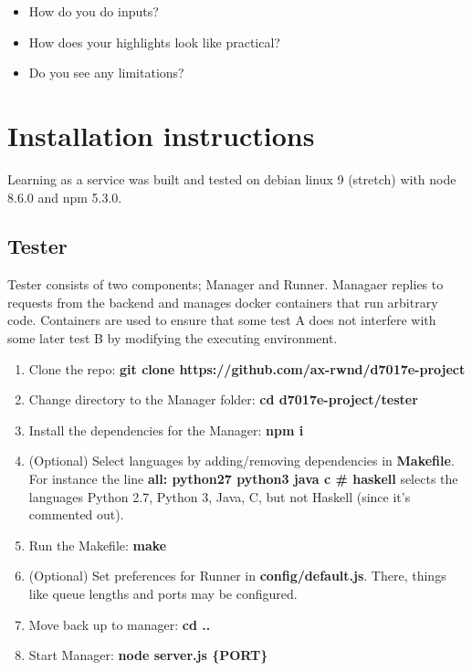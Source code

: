 \begin{itemize}
\item How do you do inputs?
\item How does your highlights look like practical?
\item Do you see any limitations?
\end{itemize} 

\chapter{Installation instructions}
Learning as a service was built and tested on debian linux 9 (stretch) with node 8.6.0 and npm 5.3.0.
\section{Tester}
Tester consists of two components; Manager and Runner. Managaer replies to requests from the backend and manages docker containers that run arbitrary code. Containers are used to ensure that some test A does not interfere with some later test B by modifying the executing environment.\\
\begin{enumerate}
    \item Clone the repo: \textbf{git clone https://github.com/ax-rwnd/d7017e-project}
    \item Change directory to the Manager folder: \textbf{cd d7017e-project/tester}
    \item Install the dependencies for the Manager: \textbf{npm i}
    \item (Optional) Select languages by adding/removing dependencies in \textbf{Makefile}. For instance the line\textbf{ all: python27 python3 java c \# haskell} selects the languages Python 2.7, Python 3, Java, C, but not Haskell (since it's commented out).
    \item Run the Makefile: \textbf{make}
    \item (Optional) Set preferences for Runner in \textbf{config/default.js}. There, things like queue lengths and ports may be configured.
    \item Move back up to manager: \textbf{cd ..}
    \item Start Manager: \textbf{node server.js \{PORT\}}
\end{enumerate}

